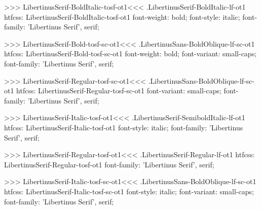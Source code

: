 {{{{>>>
\<LibertinusSerif-BoldItalic-tosf-ot1\><<<
.LibertinusSerif-BoldItalic-lf-ot1
htfcss:  LibertinusSerif-BoldItalic-tosf-ot1  font-weight: bold; font-style: italic; font-family: 'Libertinus Serif', serif;

>>>
\<LibertinusSerif-Bold-tosf-sc-ot1\><<<
.LibertinusSans-BoldOblique-lf-sc-ot1
htfcss:  LibertinusSerif-Bold-tosf-sc-ot1  font-weight: bold; font-variant: small-caps; font-family: 'Libertinus Serif', serif;

>>>
\<LibertinusSerif-Regular-tosf-sc-ot1\><<<
.LibertinusSans-BoldOblique-lf-sc-ot1
htfcss:  LibertinusSerif-Regular-tosf-sc-ot1  font-variant: small-caps; font-family: 'Libertinus Serif', serif;

>>>
\<LibertinusSerif-Italic-tosf-ot1\><<<
.LibertinusSerif-SemiboldItalic-lf-ot1
htfcss:  LibertinusSerif-Italic-tosf-ot1  font-style: italic; font-family: 'Libertinus Serif', serif;

>>>
\<LibertinusSerif-Regular-tosf-ot1\><<<
.LibertinusSerif-Regular-lf-ot1
htfcss:  LibertinusSerif-Regular-tosf-ot1  font-family: 'Libertinus Serif', serif;

>>>
\<LibertinusSerif-Italic-tosf-sc-ot1\><<<
.LibertinusSans-BoldOblique-lf-sc-ot1
htfcss:  LibertinusSerif-Italic-tosf-sc-ot1  font-style: italic; font-variant: small-caps; font-family: 'Libertinus Serif', serif;

}}}}
